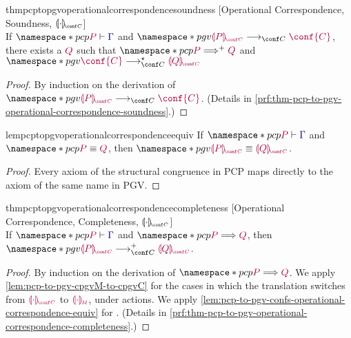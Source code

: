 \documentclass[main.tex]{subfiles}
\begin{document}
\begin{restatabletheorem}{thmpcptopgvoperationalcorrespondencesoundness}%
  [Operational Correspondence, Soundness, $\cpgvC{\cdot}$]
  \label{thm:pcp-to-pgv-operational-correspondence-soundness}
  \hfill\\%
  If $\pcp{\seq{P}{\ty{\Gamma}}}$ and $\pgv{\tm{\cpgvC{P}}\cred\tm{\conf{C}}}$,
  there exists a $\tm{Q}$ such that $\pcp{\tm{P}\red^+\tm{Q}}$ and $\pgv{\tm{\conf{C}}\cred^\star\tm{\cpgvC{Q}}}$
\end{restatabletheorem}
\begin{proof}
  By induction on the derivation of $\pgv{\tm{\cpgvC{P}}\cred\tm{\conf{C}}}$.
  (Details in \cref{prf:thm-pcp-to-pgv-operational-correspondence-soundness}.)
\end{proof}

\begin{restatablelemma}{lempcptopgvoperationalcorrespondenceequiv}%
  \label{lem:pcp-to-pgv-confs-operational-correspondence-equiv}
  If $\pcp{\seq{P}{\ty{\Gamma}}}$ and $\pcp{\tm{P}\equiv\tm{Q}}$,
  then $\pgv{\tm{\cpgvC{P}}\equiv\tm{\cpgvC{Q}}}$.
\end{restatablelemma}
\begin{proof}
  Every axiom of the structural congruence in PCP maps directly to the axiom of the same name in PGV.
\end{proof}

\begin{restatabletheorem}{thmpcptopgvoperationalcorrespondencecompleteness}%
  [Operational Correspondence, Completeness, $\cpgvC{\cdot}$]
  \label{thm:pcp-to-pgv-operational-correspondence-completeness}
  \hfill\\%
  If $\pcp{\seq{P}{\ty{\Gamma}}}$ and $\pcp{\tm{P}\red\tm{Q}}$,
  then $\pgv{\tm{\cpgvC{P}}\cred^+\tm{\cpgvC{Q}}}$.
\end{restatabletheorem}
\begin{proof}
  By induction on the derivation of $\pcp{\tm{P}\red\tm{Q}}$.
  We apply \cref{lem:pcp-to-pgv-cpgvM-to-cpgvC} for the cases in which
  the translation switches from $\tm{\cpgvC{\cdot}}$ to $\tm{\cpgvM{\cdot}}$,
  \ie under actions.
  We apply \cref{lem:pcp-to-pgv-confs-operational-correspondence-equiv} for
  . 
  (Details in \cref{prf:thm-pcp-to-pgv-operational-correspondence-completeness}.)
\end{proof}
\end{document}
